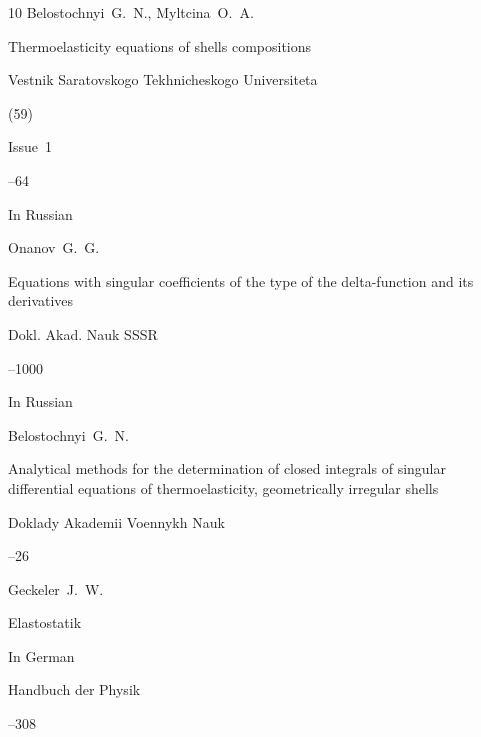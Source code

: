 \begin{thebibliography}{10}
\by Belostochnyi~G.~N., Myltcina~O.~A.

\paper Thermoelasticity equations of shells compositions

\jour Vestnik Saratovskogo Tekhnicheskogo Universiteta


 (59)

\issueinfo Issue~1

--64



   


\lang In Russian

\by Onanov~G.~G.

\paper Equations with singular coefficients of the type of the delta-function and its derivatives

\jour Dokl. Akad. Nauk SSSR




--1000










\lang In Russian

\by Belostochnyi~G.~N.

\paper Analytical methods for the determination of closed integrals of singular differential equations of thermoelasticity, geometrically irregular shells

\jour Doklady Akademii Voennykh Nauk



--26






\by Geckeler~J.~W.

\paper Elastostatik

\lang In German


\inbook Handbuch der Physik 


--308







\end{thebibliography}
